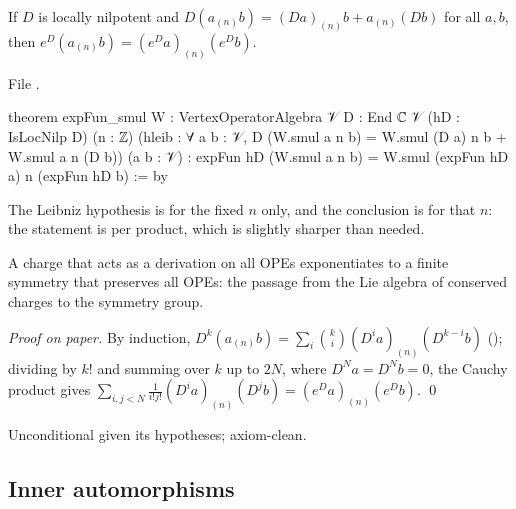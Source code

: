 \begin{theorem}\label{l04:thm:expsmul}
If $D$ is locally nilpotent and $D(a_{(n)}b) = (Da)_{(n)}b + a_{(n)}(Db)$ for all $a,b$, then
$e^D(a_{(n)}b) = (e^Da)_{(n)}(e^Db)$.
\end{theorem}
\noindent File .
\begin{leancode}
theorem expFun_smul {W : VertexOperatorAlgebra 𝒱} {D : End ℂ 𝒱} (hD : IsLocNilp D) (n : ℤ)
    (hleib : ∀ a b : 𝒱, D (W.smul a n b) = W.smul (D a) n b + W.smul a n (D b))
    (a b : 𝒱) :
    expFun hD (W.smul a n b) = W.smul (expFun hD a) n (expFun hD b) := by
\end{leancode}
\begin{dictionary}
The Leibniz hypothesis  is for the fixed $n$ only, and the conclusion is for that $n$:
the statement is per product, which is slightly sharper than needed.
\end{dictionary}
\begin{physics}
A charge that acts as a derivation on all OPEs exponentiates to a finite symmetry that preserves all
OPEs: the passage from the Lie algebra of conserved charges to the symmetry group.
\end{physics}
\emph{Proof on paper.} By induction, $D^k(a_{(n)}b) = \sum_i\binom ki(D^ia)_{(n)}(D^{k-i}b)$
(); dividing by $k!$ and summing over $k$ up to $2N$, where $D^Na = D^Nb = 0$,
the Cauchy product gives $\sum_{i,j<N}\frac{1}{i!j!}(D^ia)_{(n)}(D^jb) = (e^Da)_{(n)}(e^Db)$. \qed
\begin{status}
Unconditional given its hypotheses; axiom-clean.
\end{status}

\subsection{Inner automorphisms}

